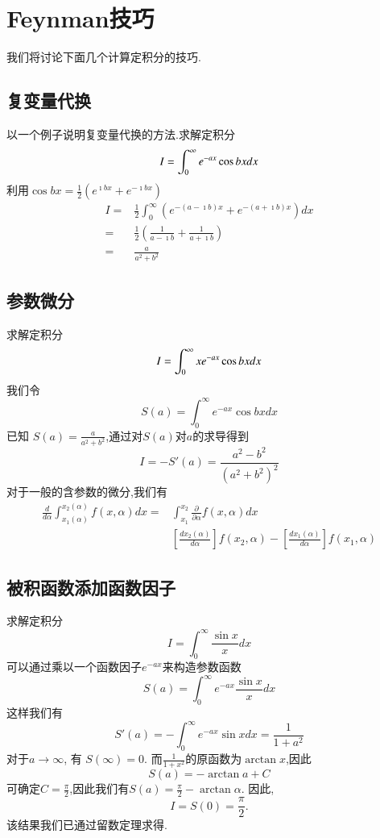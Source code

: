 \section{Feynman技巧}
我们将讨论下面几个计算定积分的技巧.

\subsection{复变量代换}
以一个例子说明复变量代换的方法.求解定积分
\[
    I =  \int_0^{\infty} e^{-a x} \cos b x d x \\
\]
利用$\cos{bx} = \frac{1}{2}\left( e^{\imath b x} + e^{-\imath bx}\right)$
\[    \begin{aligned}
    I= & \frac{1}{2} \int_{0}^{\infty} \left(e^{-(a-\imath b) x} + e^{-(a + \imath b) x} \right)  d x \\
    = & \frac{1}{2} \left( \frac{1}{a-\imath b} +  \frac{1}{a+\imath b} \right)\\
    = & \frac{a}{a^2+b^2}
\end{aligned}
\]

\subsection{参数微分}
求解定积分
\[
    I =  \int_0^{\infty} x e^{-a x} \cos b x d x \\
\]
我们令
\[
  S(a) =   \int_0^{\infty} e^{-a x} \cos b x d x 
\]
已知 $S(a) = \frac{a}{a^2+b^2}$,通过对$S(a)$对$a$的求导得到
\[
    I = - S'(a)  = \frac{a^2 - b^2}{(a^2 +b^2)^2}    
\]
对于一般的含参数的微分,我们有
\begin{equation}
    \begin{aligned}
    \frac{d}{d \alpha} \int_{x_1(\alpha)}^{x_2(\alpha)} f(x, \alpha) d x= & \int_{x_1}^{x_2} \frac{\partial}{\partial \alpha} f(x, \alpha) d x \\
    & \left[\frac{d x_2(\alpha)}{d \alpha} \right] f(x_2, \alpha)- 
    \left[\frac{d x_1(\alpha)}{d \alpha}\right] f(x_1, \alpha)
    \end{aligned}
\end{equation}

\subsection{被积函数添加函数因子}
求解定积分
\[
    I =  \int_0^{\infty} \frac{\sin{x}}{x} d x 
\]
可以通过乘以一个函数因子$e^{-a x}$来构造参数函数
\[
 S(a) =     \int_0^{\infty}  e^{-a x} \frac{\sin{x}}{x} d x 
\]
这样我们有
\[
  S'(a) = -  \int_0^{\infty}  e^{-a x} \sin{x} d x  = \frac{1}{1+a^2}
\]
对于$a \to \infty$, 有 $S(\infty) = 0$.
而$\frac{1}{1+x^2}$的原函数为$\arctan{x}$,因此
\[S(a) = - \arctan{a} + C\]
可确定$C = \frac{\pi}{2}$,因此我们有$S(a) = \frac{\pi}{2} - \arctan{\alpha}$.
因此,
\[
  I = S(0) = \frac{\pi}{2} .    
\]
该结果我们已通过留数定理求得.